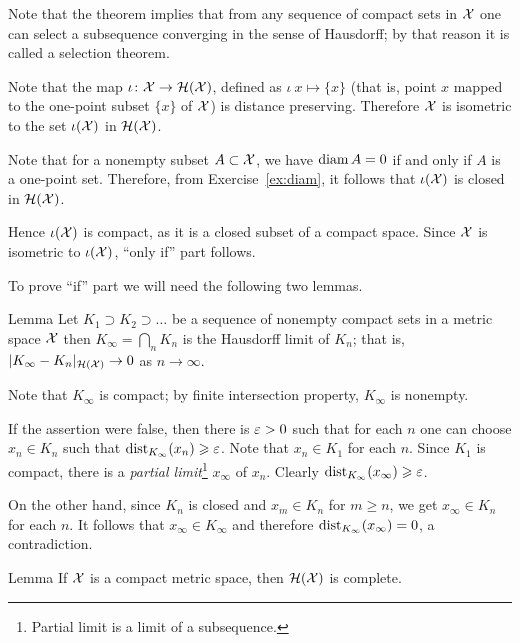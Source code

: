 Note that the theorem implies that from any sequence of compact sets in $\mathcal{X}$ one can select a subsequence converging in the sense of Hausdorff; 
by that reason it is called a selection theorem. 

Note that the map $\iota\colon\mathcal{X}\to \mathcal{H}(\mathcal{X})$, defined as $\iota\:x\mapsto\{x\}$
(that is, point $x$ mapped to the one-point subset $\{x\}$ of $\mathcal{X}$)
is distance preserving.
Therefore $\mathcal{X}$ is isometric to the set $\iota(\mathcal{X})$ in $\mathcal{H}(\mathcal{X})$.

Note that for a nonempty subset $A\subset \mathcal{X}$, we have $\operatorname{\rm diam}\nolimits A=0$ if and only if $A$ is a one-point set.
Therefore, from Exercise~\ref{ex:diam}, it follows 
that $\iota(\mathcal{X})$ is closed in $\mathcal{H}(\mathcal{X})$.

Hence $\iota(\mathcal{X})$  is compact, as it is a closed subset of a compact space. 
Since $\mathcal{X}$ is isometric to $\iota(\mathcal{X})$,
``only if'' part follows.
\qeds

To prove ``if'' part we will need the following two lemmas.%

\begin{thm}{Lemma}\label{lem:decreasing-converges}
Let $K_1\supset K_2\supset\dots$ be a sequence of nonempty compact sets in a metric space $\mathcal{X}$
then $K_\infty=\bigcap_n K_n$ is the Hausdorff limit of $K_n$;
that is, $|K_\infty-K_n|_{\mathcal{H}(\mathcal{X})}\to0$ as $n\to\infty$.
\end{thm}

Note that $K_\infty$ is compact;
by finite intersection property, $K_\infty$ is nonempty.

If the assertion were false, 
then there is $\varepsilon>0$ such that for each $n$ 
one can choose $x_n\in K_n$
such that $\mathrm{dist}_{K_\infty}(x_n)\geqslant\varepsilon$.
Note that $x_n\in K_1$ for each $n$.
Since $K_1$ is compact, 
there is 
a \emph{partial limit}\footnote{Partial limit is a limit of a subsequence.}
 $x_\infty$ of $x_n$.
Clearly $\mathrm{dist}_{K_\infty}(x_\infty)\geqslant \varepsilon$.

On the other hand, since $K_n$ is closed and $x_m\in K_n$ for $m\ge n$,
we get $x_\infty\in K_n$ for each $n$.
It follows that $x_\infty\in K_\infty$ and therefore $\mathrm{dist}_{K_\infty}(x_\infty)=0$,
a contradiction.\qeds


\begin{thm}{Lemma}\label{lem:complete+Hausdorff}
If $\mathcal{X}$ is a compact metric space, then $\mathcal{H}(\mathcal{X})$
is complete.
\end{thm}

